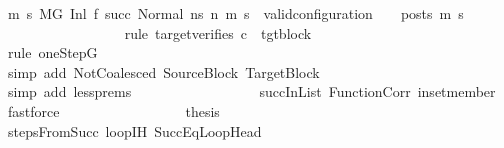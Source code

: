 \begin{isabellebody}
\ {\isachardoublequoteopen}{\isasymforall}m{}{\isacharprime}{\kern0pt}\ s{}{\isacharprime}{\kern0pt}{\isachardot}{\kern0pt}\ {\isacharparenleft}{\kern0pt}M{\isacharcomma}{\kern0pt}{\isasymLambda}{\isacharcomma}{\kern0pt}{\isasymGamma}{\isacharcomma}{\kern0pt}{\isasymOmega}{\isacharcomma}{\kern0pt}G{\isacharprime}{\kern0pt}\ {\isasymturnstile}{\isacharparenleft}{\kern0pt}Inl\ {\isacharparenleft}{\kern0pt}f\ succ{\isacharparenright}{\kern0pt}{\isacharcomma}{\kern0pt}\ Normal\ ns{\isacharprime}{\kern0pt}{\isacharparenright}{\kern0pt}\ {\isacharminus}{\kern0pt}n{\isasymrightarrow}{\isacharasterisk}{\kern0pt}\ {\isacharparenleft}{\kern0pt}m{}{\isacharprime}{\kern0pt}{\isacharcomma}{\kern0pt}\ s{}{\isacharprime}{\kern0pt}{\isacharparenright}{\kern0pt}{\isacharparenright}{\kern0pt}\ {\isasymlongrightarrow}\ valid{\isacharunderscore}{\kern0pt}configuration\ {\isasymLambda}\ {\isasymGamma}\ {\isasymOmega}\ posts\ m{}{\isacharprime}{\kern0pt}\ s{}{\isacharprime}{\kern0pt}{\isachardoublequoteclose}\isanewline
\ \ \ \ \ \ \ \ \ \ \ \ \ \ \ \ \isamarkupfalse%
\ {\isacharparenleft}{\kern0pt}rule\ target{\isacharunderscore}{\kern0pt}verifies{\isacharbrackleft}{\kern0pt}\ {\isacharquery}{\kern0pt}c\ {\isacharequal}{\kern0pt}\ tgt{\isacharunderscore}{\kern0pt}block{\isacharbrackright}{\kern0pt}{\isacharparenright}{\kern0pt}\isanewline
\ \ \ \ \ \ \ \ \ \ \ \ \ \ \ \ \isamarkupfalse%
\ {\isacharparenleft}{\kern0pt}rule\ oneStepG{\isacharparenright}{\kern0pt}\isanewline
\ \ \ \ \ \ \ \ \ \ \ \ \ \ \ \ \isamarkupfalse%
\ {\isacharparenleft}{\kern0pt}simp\ add{\isacharcolon}{\kern0pt}\ NotCoalesced\ SourceBlock\ TargetBlock{\isacharparenright}{\kern0pt}\isanewline
\ \ \ \ \ \ \ \ \ \ \ \ \ \ \ \ \isamarkupfalse%
\ {\isacharparenleft}{\kern0pt}simp\ add{\isacharcolon}{\kern0pt}\ less{\isachardot}{\kern0pt}prems{\isacharparenleft}{\kern0pt}{}{\isacharparenright}{\kern0pt}{\isacharparenright}{\kern0pt}\isanewline
\ \ \ \ \ \ \ \ \ \ \ \ \ \ \ \ \isamarkupfalse%
\ succInList\ FunctionCorr\ in{\isacharunderscore}{\kern0pt}set{\isacharunderscore}{\kern0pt}member\ \isamarkupfalse%
\ fastforce\isanewline
\ \ \ \ \ \ \ \ \ \ \ \ \ \ \isamarkupfalse%
\ \isamarkupfalse%
\ {\isacharquery}{\kern0pt}thesis\isanewline
\ \ \ \ \ \ \ \ \ \ \ \ \ \ \ \ \isamarkupfalse%
\ stepsFromSucc\ loopIH\ SuccEqLoopHead\isanewline

\end{isabellebody}
